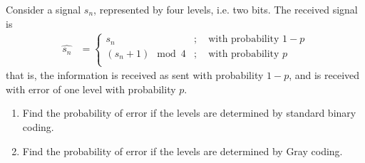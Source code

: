 \documentclass[titlepage, fleqn, a4paper, 12pt, twoside]{article}
\theoremstyle{definition}
\theoremstyle{theorem}
\begin{document}
\begin{question}
	Consider a signal $s_n$, represented by four levels, i.e. two bits.
	The received signal is
	\begin{align*}
		\hat{s_n} &=
			\begin{cases}
				s_n &;\quad \text{with probability $1 - p$}\\
				(s_n + 1) \mod 4 &;\quad \text{with probability $p$}\\
			\end{cases}
	\end{align*}
	that is, the information is received as sent with probability $1 - p$, and is received with error of one level with probability $p$.
	\begin{enumerate}
		\item
			Find the probability of error if the levels are determined by standard binary coding.
		\item
			Find the probability of error if the levels are determined by Gray coding.
	\end{enumerate}
\end{question}
\end{document}
